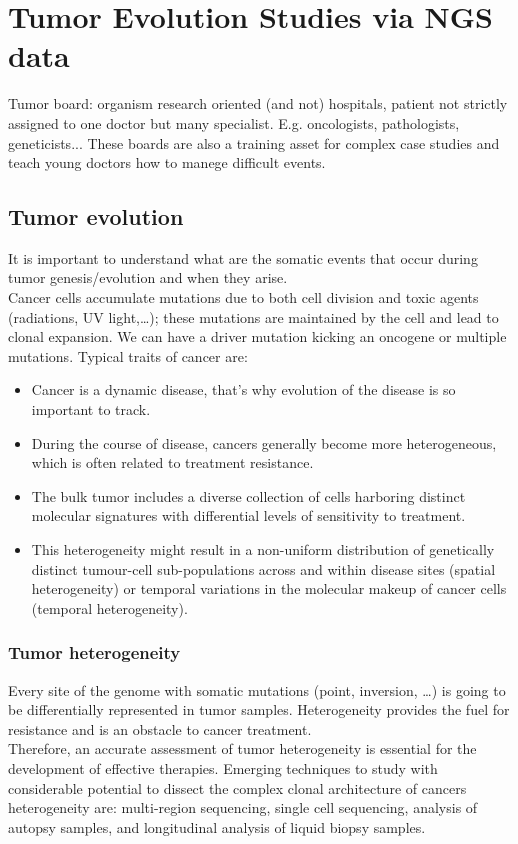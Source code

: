 \graphicspath{{chapters/notes/05/images}}
\chapter{Tumor Evolution Studies via NGS data}
Tumor board: organism research oriented (and not) hospitals, patient not strictly assigned to one doctor but many specialist. E.g. oncologists, pathologists, geneticists... These boards are also a training asset for complex case studies and teach young doctors how to manege difficult events.
\\
\section{Tumor evolution}
It is important to understand what are the somatic events that occur during tumor genesis/evolution and when they arise.\\
Cancer cells accumulate mutations due to both cell division and toxic agents (radiations, UV light,…); these mutations are maintained by the cell and lead to clonal expansion.  We can have a driver mutation kicking an oncogene or multiple mutations.
Typical traits of cancer are:
\begin{itemize}
\item Cancer is a dynamic disease, that's why evolution of the disease is so important to track.
\item During the course of disease, cancers generally become more heterogeneous, which is often related to treatment resistance.
\item The bulk tumor includes a diverse collection of cells harboring distinct molecular signatures with differential levels of sensitivity to treatment.
\item This heterogeneity might result in a non-uniform distribution of genetically distinct tumour-cell sub-populations across and within disease sites (spatial heterogeneity) or temporal variations in the molecular makeup of cancer cells (temporal heterogeneity).
\end{itemize}

\subsection{Tumor heterogeneity}
Every site of the genome with somatic mutations (point, inversion, …) is going to be differentially represented in tumor samples. Heterogeneity provides the fuel for resistance and is an obstacle to cancer treatment.
\\
Therefore, an accurate assessment of tumor heterogeneity is essential for the development of effective therapies. Emerging techniques to study with considerable potential to dissect the complex clonal architecture of cancers heterogeneity are: multi-region sequencing, single cell sequencing, analysis of autopsy samples, and longitudinal analysis of liquid biopsy samples.
\\
\\

